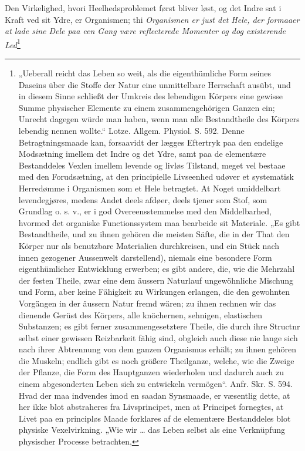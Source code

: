 \documentclass[12pt,a4paper]{book}
\begin{document}
Den Virkelighed, hvori Heelhedsproblemet først bliver løst, og det Indre
sat i Kraft ved sit Ydre, er Organismen; thi \emph{Organismen er just
det Hele, der formaaer at lade sine Dele paa een Gang være reflecterede
Momenter og dog existerende Led}\footnote{„Ueberall reicht das Leben so
weit, als die eigenthümliche Form seines Daseins über die Stoffe der
Natur eine unmittelbare Herrschaft ausübt, und in diesem Sinne schließt
der Umkreis des lebendigen Körpers eine gewisse Summe physischer
Elemente zu einem zusammengehörigen Ganzen ein; Unrecht dagegen würde
man haben, wenn man alle Bestandtheile des Körpers lebendig nennen
wollte.“ Lotze. Allgem. Physiol. S. 592. Denne Betragtningsmaade kan,
forsaavidt der lægges Eftertryk paa den endelige Modsætning imellem det
Indre og det Ydre, samt paa de elementære Bestanddeles Vexlen imellem
levende og livløs Tilstand, meget vel bestaae med den Forudsætning, at
den principielle Livseenhed udøver et systematisk Herredømme i
Organismen som et Hele betragtet. At Noget umiddelbart levendegjøres,
medens Andet deels afdøer, deels tjener som Stof, som Grundlag o. s. v.,
er i god Overeensstemmelse med den Middelbarhed, hvormed det organiske
Functionssystem maa bearbeide sit Materiale. „Es gibt Bestandtheile, und
zu ihnen gehören die meisten Säfte, die in der That den Körper nur als
benutzbare Materialien durchkreisen, und ein Stück nach innen gezogener
Aussenwelt darstellend), niemals eine besondere Form eigenthümlicher
Entwicklung erwerben; es gibt andere, die, wie die Mehrzahl der festen
Theile, zwar eine dem äussern Naturlauf ungewöhnliche Mischung und Form,
aber keine Fähigkeit zu Wirkungen erlangen, die den gewohnten Vorgängen
in der äussern Natur fremd wären; zu ihnen rechnen wir das dienende
Gerüst des Körpers, alle knöchernen, sehnigen, elastischen Substanzen;
es gibt ferner zusammengesetztere Theile, die durch ihre Structnr selbst
einer gewissen Reizbarkeit fähig sind, obgleich auch diese nie lange
sich nach ihrer Abtrennung von dem ganzen Organismus erhält; zu ihnen
gehören die Muskeln; endlich gibt es noch größere Theilganze, welche,
wie die Zweige der Pflanze, die Form des Hauptganzen wiederholen und
dadurch auch zu einem abgesonderten Leben sich zu entwickeln vermögen“.
Anfr. Skr. S. 594. Hvad der maa indvendes imod en saadan Synsmaade, er
væsentlig dette, at her ikke blot abstraheres fra Livsprincipet, men at
Principet fornegtes, at Livet paa en principløs Maade forklares af de
elementære Bestanddeles blot physiske Vexelvirkning. „Wie wir \dots{}
das Leben selbst als eine Verknüpfung physischer Processe betrachten,
}
\end{document}
